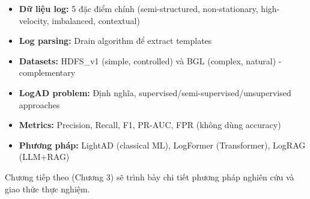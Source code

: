 \begin{itemize}
    \item \textbf{Dữ liệu log:} 5 đặc điểm chính (semi-structured, non-stationary, high-velocity, imbalanced, contextual)
    \item \textbf{Log parsing:} Drain algorithm để extract templates
    \item \textbf{Datasets:} HDFS\_v1 (simple, controlled) và BGL (complex, natural) - complementary
    \item \textbf{LogAD problem:} Định nghĩa, supervised/semi-supervised/unsupervised approaches
    \item \textbf{Metrics:} Precision, Recall, F1, PR-AUC, FPR (không dùng accuracy)
    \item \textbf{Phương pháp:} LightAD (classical ML), LogFormer (Transformer), LogRAG (LLM+RAG)
\end{itemize}

Chương tiếp theo (Chương 3) sẽ trình bày chi tiết phương pháp nghiên cứu và giao thức thực nghiệm.
